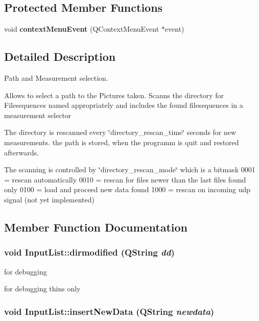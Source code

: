 \subsection*{Protected Member Functions}
\begin{CompactItemize}
\item 
\hypertarget{class_input_list_665a5b3ce65df80e18f91c5e292d4d2f}{
void \textbf{contextMenuEvent} (QContextMenuEvent $\ast$event)}
\label{class_input_list_665a5b3ce65df80e18f91c5e292d4d2f}

\end{CompactItemize}


\subsection{Detailed Description}
Path and Measurement selection. 

Allows to select a path to the Pictures taken. Scanns the directory for Filesequences named appropriately and includes the found filesequences in a measurement selector

The directory is rescanned every \char`\"{}directory\_\-rescan\_\-time\char`\"{} seconds for new measurements. the path is stored, when the programm is quit and restored afterwards.

The scanning is controlled by \char`\"{}directory\_\-rescan\_\-mode\char`\"{} which is a bitmask 0001 = rescan automatically 0010 = rescan for files newer than the last files found only 0100 = load and proceed new data found 1000 = rescan on incoming udp signal (not yet implemented) 

\subsection{Member Function Documentation}
\hypertarget{class_input_list_23a669cb1d1b927350a85639d7b5d6c6}{
\subsubsection[{dirmodified}]{\setlength{\rightskip}{0pt plus 5cm}void InputList::dirmodified (QString {\em dd})}}
\label{class_input_list_23a669cb1d1b927350a85639d7b5d6c6}


for debugging 

for debugging thins only \hypertarget{class_input_list_36d4f06e3929f82e71bd2429be776f13}{
\subsubsection[{insertNewData}]{\setlength{\rightskip}{0pt plus 5cm}void InputList::insertNewData (QString {\em newdata})}}
\label{class_input_list_36d4f06e3929f82e71bd2429be776f13}


